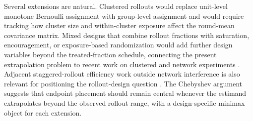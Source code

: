 Several extensions are natural. Clustered rollouts would replace unit-level monotone Bernoulli assignment with group-level assignment and would require tracking how cluster size and within-cluster exposure affect the round-mean covariance matrix. Mixed designs that combine rollout fractions with saturation, encouragement, or exposure-based randomization would add further design variables beyond the treated-fraction schedule, connecting the present extrapolation problem to recent work on clustered and network experiments \citep{chen2025,fan2025,bhadra2025,schroder2026}. Adjacent staggered-rollout efficiency work outside network interference is also relevant for positioning the rollout-design question \citep{roth2021}. The Chebyshev argument suggests that endpoint placement should remain central whenever the estimand extrapolates beyond the observed rollout range, with a design-specific minimax object for each extension.
